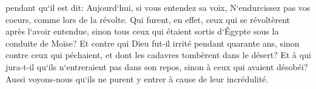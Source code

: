 \verse pendant qu`il est dit: Aujourd`hui, si vous entendez sa voix, N`endurcissez pas vos coeurs, comme lors de la révolte. 
\verse Qui furent, en effet, ceux qui se révoltèrent après l`avoir entendue, sinon tous ceux qui étaient sortis d`Égypte sous la conduite de Moïse? 
\verse Et contre qui Dieu fut-il irrité pendant quarante ans, sinon contre ceux qui péchaient, et dont les cadavres tombèrent dans le désert? 
\verse Et à qui jura-t-il qu`ils n`entreraient pas dans son repos, sinon à ceux qui avaient désobéi? 
\verse Aussi voyons-nous qu`ils ne purent y entrer à cause de leur incrédulité. 

